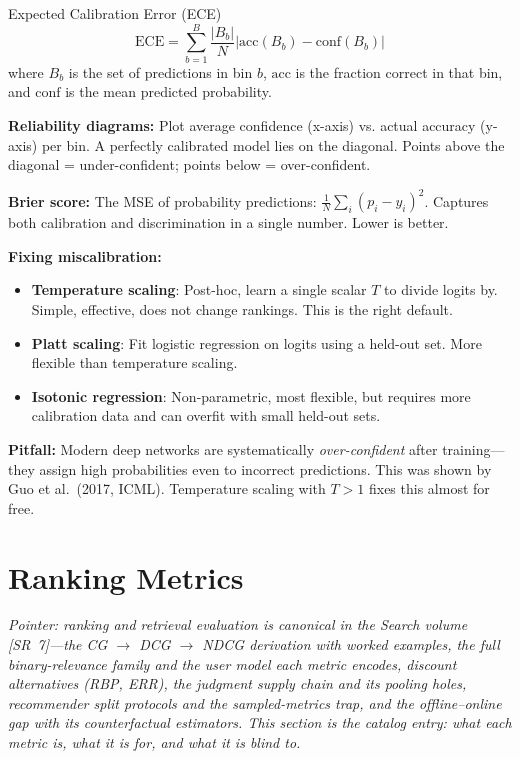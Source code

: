 \begin{mathresult}{Expected Calibration Error (ECE)}
\[
\text{ECE} = \sum_{b=1}^{B} \frac{|B_b|}{N} \left| \text{acc}(B_b) - \text{conf}(B_b) \right|
\]
where $B_b$ is the set of predictions in bin $b$, $\text{acc}$ is the fraction correct in that bin, and $\text{conf}$ is the mean predicted probability.
\end{mathresult}

\textbf{Reliability diagrams:} Plot average confidence (x-axis) vs. actual accuracy (y-axis) per bin. A perfectly calibrated model lies on the diagonal. Points above the diagonal = under-confident; points below = over-confident.

\textbf{Brier score:} The MSE of probability predictions: $\frac{1}{N}\sum_i (p_i - y_i)^2$. Captures both calibration and discrimination in a single number. Lower is better.

\textbf{Fixing miscalibration:}
\begin{itemize}
    \item \textbf{Temperature scaling}: Post-hoc, learn a single scalar $T$ to divide logits by. Simple, effective, does not change rankings. This is the right default.
    \item \textbf{Platt scaling}: Fit logistic regression on logits using a held-out set. More flexible than temperature scaling.
    \item \textbf{Isotonic regression}: Non-parametric, most flexible, but requires more calibration data and can overfit with small held-out sets.
\end{itemize}

\textbf{Pitfall:} Modern deep networks are systematically \textit{over-confident} after training---they assign high probabilities even to incorrect predictions. This was shown by Guo et al.\ (2017, ICML). Temperature scaling with $T > 1$ fixes this almost for free.

\section{Ranking Metrics}
\label{sec:ranking_metrics}

\textit{Pointer: ranking and retrieval evaluation is canonical in the Search volume [SR~7]---the CG $\to$ DCG $\to$ NDCG derivation with worked examples, the full binary-relevance family and the user model each metric encodes, discount alternatives (RBP, ERR), the judgment supply chain and its pooling holes, recommender split protocols and the sampled-metrics trap, and the offline--online gap with its counterfactual estimators. This section is the catalog entry: what each metric is, what it is for, and what it is blind to.}

